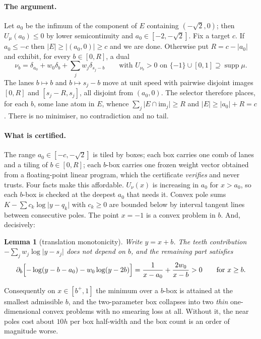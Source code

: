 \documentclass[11pt]{article}
\newtheorem{lemma}{Lemma}
\newcommand{\supp}{\operatorname{supp}}
\begin{document}
\paragraph{The argument.} Let $a_0$ be the infimum of the component of
$E$ containing $(-\sqrt2,0)$; then $U_\mu(a_0)\le0$ by lower
semicontinuity and $a_0\in[-2,-\sqrt2]$. Fix a target $c$. If
$a_0\le -c$ then $\lvert E\rvert\ge\lvert(a_0,0)\rvert\ge c$ and we are
done. Otherwise put $R=c-\lvert a_0\rvert$ and exhibit, for every
$b\in[0,R]$, a dual
\[
  \nu_b=\delta_{a_0}+w_0\delta_b+\sum_j w_j\delta_{s_j-b}
  \qquad\text{with } U_{\nu_b}>0 \text{ on } \{-1\}\cup[0,1] \supseteq \supp\mu .
\]
The lanes $b\mapsto b$ and $b\mapsto s_j-b$ move at unit speed with
pairwise disjoint images $[0,R]$ and $[s_j-R,s_j]$, all disjoint from
$(a_0,0)$. The selector therefore places, for each $b$, some lane atom
in $E$, whence $\sum_j\lvert E\cap\mathrm{im}_j\rvert\ge R$ and
$\lvert E\rvert\ge\lvert a_0\rvert+R=c$. There is no minimiser, no
contradiction and no tail.

\paragraph{What is certified.} The range $a_0\in[-c,-\sqrt2]$ is tiled by
boxes; each box carries one comb of lanes and a tiling of $b\in[0,R]$;
each $b$-box carries one frozen weight vector obtained from a
floating-point linear program, which the certificate \emph{verifies} and
never trusts. Four facts make this affordable. $U_\nu(x)$ is increasing
in $a_0$ for $x>a_0$, so each $b$-box is checked at the deepest $a_0$
that needs it. Convex pole sums $K-\sum c_k\log\lvert y-q_k\rvert$ with
$c_k\ge0$ are bounded below by interval tangent lines between
consecutive poles. The point $x=-1$ is a convex problem in $b$. And,
decisively:

\begin{lemma}[translation monotonicity]
Write $y=x+b$. The teeth contribution
$-\sum_j w_j\log\lvert y-s_j\rvert$ does not depend on $b$, and the
remaining part satisfies
\[
  \partial_b\Bigl[-\log(y-b-a_0)-w_0\log(y-2b)\Bigr]
  = \frac{1}{x-a_0}+\frac{2w_0}{x-b} > 0
  \qquad\text{for } x\ge b .
\]
\end{lemma}

Consequently on $x\in[b^+,1]$ the minimum over a $b$-box is attained at
the smallest admissible $b$, and the two-parameter box collapses into
two \emph{thin} one-dimensional convex problems with no smearing loss at
all. Without it, the near poles cost about $10h$ per box half-width and
the box count is an order of magnitude worse.
\end{document}
